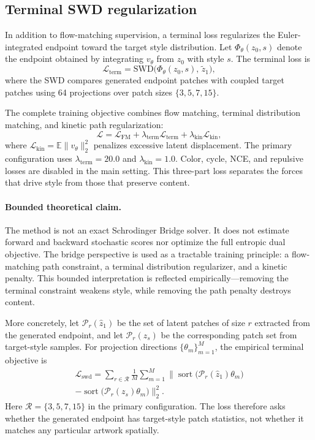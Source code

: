 ﻿\documentclass[letterpaper]{article}
\begin{document}
\subsection{Terminal SWD regularization}
In addition to flow-matching supervision, a terminal loss regularizes the Euler-integrated endpoint toward the target style distribution. Let $\Phi_\theta(z_0,s)$ denote the endpoint obtained by integrating $v_\theta$ from $z_0$ with style $s$. The terminal loss is
\begin{equation}
    \mathcal{L}_{\mathrm{term}} = \mathrm{SWD}\bigl(\Phi_\theta(z_0,s),\,\tilde{z}_1\bigr),
\end{equation}
where the SWD compares generated endpoint patches with coupled target patches using 64 projections over patch sizes $\{3,5,7,15\}$.

The complete training objective combines flow matching, terminal distribution matching, and kinetic path regularization:
\begin{equation}
    \mathcal{L} = \mathcal{L}_{\mathrm{FM}} + \lambda_{\mathrm{term}}\mathcal{L}_{\mathrm{term}} + \lambda_{\mathrm{kin}}\mathcal{L}_{\mathrm{kin}},
\end{equation}
where $\mathcal{L}_{\mathrm{kin}} = \mathbb{E}\|v_\theta\|_2^2$ penalizes excessive latent displacement. The primary configuration uses $\lambda_{\mathrm{term}}=20.0$ and $\lambda_{\mathrm{kin}}=1.0$. Color, cycle, NCE, and repulsive losses are disabled in the main setting. This three-part loss separates the forces that drive style from those that preserve content.

\paragraph{Bounded theoretical claim.}
The method is not an exact Schrodinger Bridge solver. It does not estimate forward and backward stochastic scores nor optimize the full entropic dual objective. The bridge perspective is used as a tractable training principle: a flow-matching path constraint, a terminal distribution regularizer, and a kinetic penalty. This bounded interpretation is reflected empirically---removing the terminal constraint weakens style, while removing the path penalty destroys content.

More concretely, let $\mathcal{P}_r(\hat{z}_1)$ be the set of latent patches of size $r$ extracted from the generated endpoint, and let $\mathcal{P}_r(z_s)$ be the corresponding patch set from target-style samples. For projection directions $\{\theta_m\}_{m=1}^M$, the empirical terminal objective is
\begin{multline}
    \mathcal{L}_{\mathrm{swd}} =
    \sum_{r\in\mathcal{R}} \frac{1}{M} \sum_{m=1}^{M}
    \bigl\|
    \operatorname{sort}\!\bigl(\mathcal{P}_r(\hat{z}_1)\theta_m\bigr) \\
    -
    \operatorname{sort}\!\bigl(\mathcal{P}_r(z_s)\theta_m\bigr)
    \bigr\|_2^2 .
\end{multline}
Here $\mathcal{R}=\{3,5,7,15\}$ in the primary configuration. The loss therefore asks whether the generated endpoint has target-style patch statistics, not whether it matches any particular artwork spatially.
\end{document}

